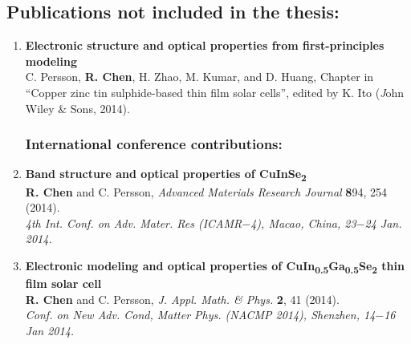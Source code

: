 \documentclass[a4paper, 12pt, titlepage,oneside,drop]{kthesis}
\begin{document}
\subsection*{Publications not included in the thesis:}
\begin{enumerate}
\renewcommand{\labelenumi}{\Roman{enumi}}
\setcounter{enumi}{3}

\subsubsection*{Book chapter:}
\item{}\textbf{Electronic structure and optical properties from first-principles modeling} \\
C. Persson, \textbf{R. Chen}, H. Zhao, M. Kumar, and D. Huang, Chapter in “Copper zinc tin sulphide-based thin film solar cells”,
edited by K. Ito ({\textit John Wiley $\&$ Sons}, 2014).



\subsubsection*{International conference contributions:}
\renewcommand{\labelenumi}{\Roman{enumi}}
\setcounter{enumi}{4}

\item{} \textbf{Band structure and optical properties of CuInSe\textsubscript{2}}
\\ \textbf{R. Chen} and C. Persson, 
\textit{Advanced Materials Research Journal} {\textbf 894}, 254 (2014). \\
\textit{4th Int. Conf. on Adv. Mater. Res (ICAMR$-$4), Macao, China, 23$-$24 Jan. 2014.}


\item{} \textbf{Electronic modeling and optical properties of CuIn\textsubscript{0.5}Ga\textsubscript{0.5}Se\textsubscript{2} thin film solar cell}
\\ \textbf{R. Chen} and C. Persson,
\textit{J. Appl. Math. \& Phys.} {\textbf 2}, 41 (2014). \\
\textit{Conf. on New Adv. Cond, Matter Phys. (NACMP 2014), Shenzhen, 14$-$16 Jan 2014.}

\end{enumerate}

\newpage
\setcounter{page}{7}
\setcounter{secnumdepth}{3}
\setcounter{tocdepth}{3}
\renewcommand\contentsname{Table of Contents}
\end{document}
